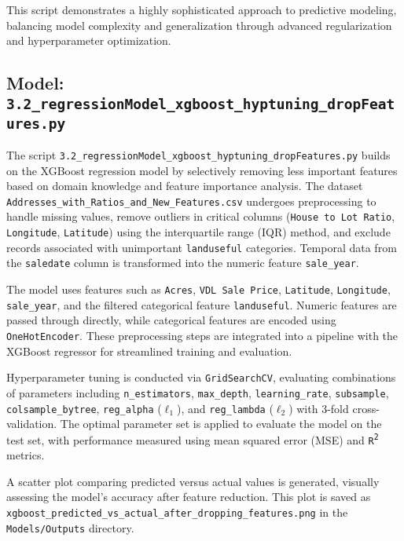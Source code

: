 This script demonstrates a highly sophisticated approach to predictive modeling, balancing model complexity and generalization through advanced regularization and hyperparameter optimization.\\

\hrulefill

\subsection{Model: \texttt{3.2\_regressionModel\_xgboost\_hyptuning\_dropFeatures.py}}

The script \texttt{3.2\_regressionModel\_xgboost\_hyptuning\_dropFeatures.py} builds on the XGBoost regression model by selectively removing less important features based on domain knowledge and feature importance analysis. The dataset \texttt{Addresses\_with\_Ratios\_and\_New\_Features.csv} undergoes preprocessing to handle missing values, remove outliers in critical columns (\texttt{House to Lot Ratio}, \texttt{Longitude}, \texttt{Latitude}) using the interquartile range (IQR) method, and exclude records associated with unimportant \texttt{landuseful} categories. Temporal data from the \texttt{saledate} column is transformed into the numeric feature \texttt{sale\_year}.

The model uses features such as \texttt{Acres}, \texttt{VDL Sale Price}, \texttt{Latitude}, \texttt{Longitude}, \texttt{sale\_year}, and the filtered categorical feature \texttt{landuseful}. Numeric features are passed through directly, while categorical features are encoded using \texttt{OneHotEncoder}. These preprocessing steps are integrated into a pipeline with the XGBoost regressor for streamlined training and evaluation.

Hyperparameter tuning is conducted via \texttt{GridSearchCV}, evaluating combinations of parameters including \texttt{n\_estimators}, \texttt{max\_depth}, \texttt{learning\_rate}, \texttt{subsample}, \texttt{colsample\_bytree}, \texttt{reg\_alpha} (\(\ell_1\)), and \texttt{reg\_lambda} (\(\ell_2\)) with 3-fold cross-validation. The optimal parameter set is applied to evaluate the model on the test set, with performance measured using mean squared error (MSE) and \texttt{R\textsuperscript{2}} metrics.

A scatter plot comparing predicted versus actual values is generated, visually assessing the model's accuracy after feature reduction. This plot is saved as \texttt{xgboost\_predicted\_vs\_actual\_after\_dropping\_features.png} in the \texttt{Models/Outputs} directory.

